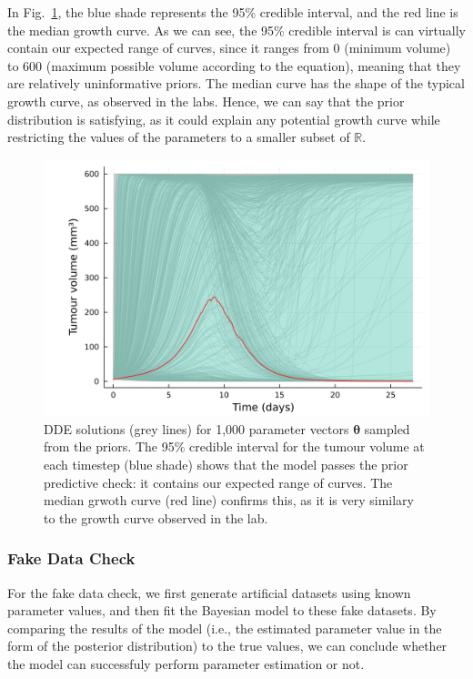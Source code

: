 \documentclass[11pt]{article}
\begin{document}
In Fig.~\ref{fig:ppc_1}, the blue shade represents the 95\% credible interval, and the red line is the median growth curve. As we can see, the 95\% credible interval is can virtually contain our expected range of curves, since it ranges from 0 (minimum volume) to 600 (maximum possible volume according to the equation), meaning that they are relatively uninformative priors. The median curve has the shape of the typical growth curve, as observed in the labs. Hence, we can say that the prior distribution is satisfying, as it could explain any potential growth curve while restricting the values of the parameters to a smaller subset of $\mathbb{R}$.
    \begin{figure}[!ht]
        \centering\includegraphics[scale=0.7]{LOGprout.png}
        \caption{DDE solutions (grey lines) for 1,000 parameter vectors $\boldsymbol{\theta}$ sampled from the priors. The 95\% credible interval for the tumour volume at each timestep (blue shade) shows that the model passes the prior predictive check: it contains our expected range of curves. The median grwoth curve (red line) confirms this, as it is very similary to the growth curve observed in the lab.}
        \label{fig:ppc_1}
    \end{figure}


\subsubsection{Fake Data Check}
For the fake data check, we first generate artificial datasets using known parameter values, and then fit the Bayesian model to these fake datasets. By comparing the results of the model (i.e., the estimated parameter value in the form of the posterior distribution) to the true values, we can conclude whether the model can successfuly perform parameter estimation or not. 
\end{document}
